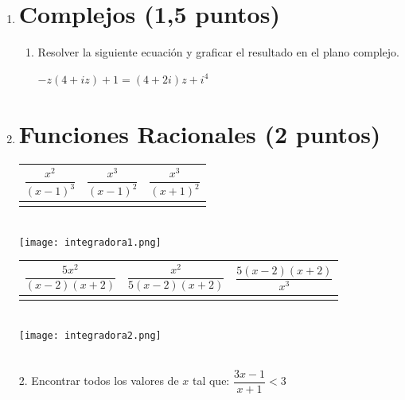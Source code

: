 \documentclass[a4paper,11pt,spanish,sans]{exam}
\newcommand{\Ts}{\rule{0pt}{2.8ex}}       %
\newcommand{\Bs}{\rule[-1.5ex]{0pt}{0pt}} %
\begin{document}
\begin{enumerate}

\item  \section*{Complejos (1,5 puntos)}

\begin{enumerate}
	\item Resolver la siguiente ecuación y graficar el resultado en el plano complejo.
	
	$-z(4+iz)+1=(4+2i)z+i^4$

\end{enumerate}
	
\item \section*{Funciones Racionales (2 puntos)}

	\begin{minipage}{0.5\textwidth}
		\centering
		\label{mc1}
		\begin{tabular}{|c|c|c|}
			\hline
			$\dfrac{x^2}{(x-1)^3}$  & $\dfrac{x^3}{(x-1)^2}$ & $\dfrac{x^3}{(x+1)^2}$ \Ts \Bs   \\ \hline
			&   &      \\ \hline
		\end{tabular}\\
		\centering
		\texttt{[image: integradora1.png]}
	\end{minipage}
	\begin{minipage}{.5\textwidth}
		\centering
		\begin{tabular}{|c|c|c|}
			\hline
			$\dfrac{5x^2}{(x-2)(x+2)}$  & $\dfrac{x^2}{5(x-2)(x+2)}$ & $\dfrac{5(x-2)(x+2)}{x^3}$ \Ts \Bs   \\ \hline
			&   &      \\ \hline
		\end{tabular}\\
		\centering
		\texttt{[image: integradora2.png]}
	\end{minipage}\\
	              
	
	2. Encontrar todos los valores de $x$ tal que: $\dfrac{3x-1}{x+1}<3$
	\\



\end{enumerate}\\
\end{document}
